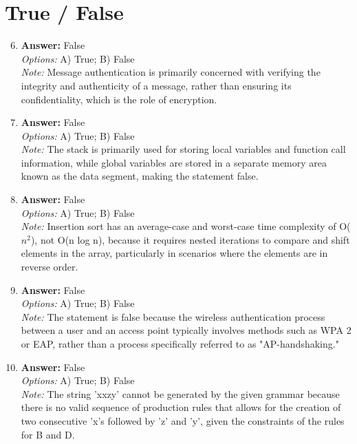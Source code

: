\documentclass[12pt]{article}
\begin{document}
\section*{True / False}
\begin{enumerate}[label=\arabic*.]
\setcounter{enumi}{5}
\item \textbf{Answer:} False
\\ \textit{Options:} A) True; B) False
\\ \textit{Note:} Message authentication is primarily concerned with verifying the integrity and authenticity of a message, rather than ensuring its confidentiality, which is the role of encryption.
\item \textbf{Answer:} False
\\ \textit{Options:} A) True; B) False
\\ \textit{Note:} The stack is primarily used for storing local variables and function call information, while global variables are stored in a separate memory area known as the data segment, making the statement false.
\item \textbf{Answer:} False
\\ \textit{Options:} A) True; B) False
\\ \textit{Note:} Insertion sort has an average-case and worst-case time complexity of O($n^2$), not O(n log n), because it requires nested iterations to compare and shift elements in the array, particularly in scenarios where the elements are in reverse order.
\item \textbf{Answer:} False
\\ \textit{Options:} A) True; B) False
\\ \textit{Note:} The statement is false because the wireless authentication process between a user and an access point typically involves methods such as WPA 2 or EAP, rather than a process specifically referred to as "AP-handshaking."
\item \textbf{Answer:} False
\\ \textit{Options:} A) True; B) False
\\ \textit{Note:} The string 'xxzy' cannot be generated by the given grammar because there is no valid sequence of production rules that allows for the creation of two consecutive 'x's followed by 'z' and 'y', given the constraints of the rules for B and D.
\end{enumerate}
\end{document}
